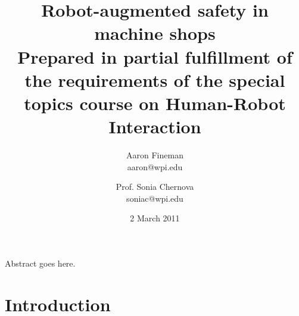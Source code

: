 \documentclass[12pt]{article}
\title{Robot-augmented safety in machine shops\\{Prepared in partial fulfillment of the requirements of the special topics course on Human-Robot Interaction}}
\author{
	Aaron Fineman\\
	aaron@wpi.edu
	\and
	Prof. Sonia Chernova\\
	soniac@wpi.edu
}
\date{2 March 2011}
\begin{document}
\maketitle

\abstract
Abstract goes here.

\section{Introduction}
\end{document}
